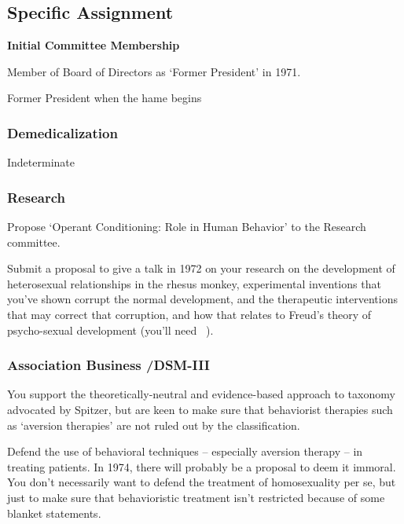 \begin{refsection}
\subsection{Specific Assignment}
\label{specificassignment}

\textbf{Initial Committee Membership}
\begin{service}[Harlow]\label{service:harlow}
Member of Board of Directors as ‘Former President’ in 1971.
\end{service}

Former President when the hame begins

\subsubsection{Demedicalization}
\label{demedicalization}

Indeterminate

\subsubsection{Research}
\label{research}

\begin{researchtask}[Harlow]\label{research:harllow}
Propose ‘Operant Conditioning: Role in Human Behavior’ to the Research committee.
\end{researchtask}

Submit a proposal to give a talk in 1972 on your research on the development of heterosexual relationships in the rhesus monkey, experimental inventions that you've shown corrupt the normal development, and the therapeutic interventions that may correct that corruption, and how that relates to Freud's theory of psycho-sexual development (you'll need ~\citep{Harlow:1975bm}).

\subsubsection{Association Business \slash  DSM-III}
\label{associationbusinessdsm-iii}

You support the theoretically-neutral and evidence-based approach to taxonomy advocated by Spitzer, but are keen to make sure that behaviorist therapies such as `aversion therapies' are not ruled out by the classification.

Defend the use of behavioral techniques – especially aversion therapy – in treating patients. In 1974, there will probably be a proposal to deem it immoral. You don't necessarily want to defend the treatment of homosexuality per se, but just to make sure that behavioristic treatment isn't restricted because of some blanket statements.


\end{refsection}
